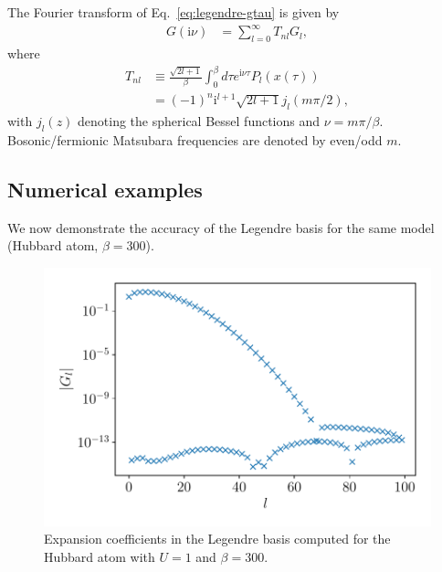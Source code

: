 \documentclass[submission, LectureNotes]{SciPost}
\newcommand\ii{\mathrm{i}}%
\newcommand\iv{\ii\nu}%
\begin{document}
The Fourier transform of Eq.~\eqref{eq:legendre-gtau} is given by
\begin{align}
    G(\iv) &= \sum_{l=0}^\infty T_{nl} G_l,
\end{align}
where
\begin{align}
    T_{nl} &\equiv \frac{\sqrt{2l+1}}{\beta} \int_0^\beta d\tau e^{\iv \tau} P_l(x(\tau))\nonumber\\
    &= (-1)^n \ii^{l+1} \sqrt{2l+1}j_l(m\pi/2),
\end{align}
with $j_l(z)$ denoting the spherical Bessel functions and $\nu = m \pi/\beta$.
Bosonic/fermionic Matsubara frequencies are denoted by even/odd $m$.

\subsection{Numerical examples}
We now demonstrate the accuracy of the Legendre basis for the same model (Hubbard atom, $\beta=300$).


\begin{figure}
    \centering
    \includegraphics[width=0.8\columnwidth]{legendre_hubbard_atom.pdf}
    \caption{
        Expansion coefficients in the Legendre basis computed
        for the Hubbard atom with $U=1$ and $\beta=300$.
        }
    \label{fig:legendre-hubbard-atom}
\end{figure}
\end{document}
